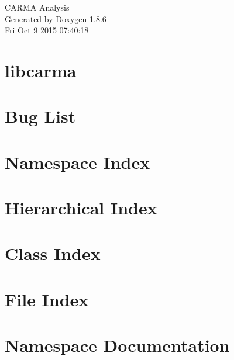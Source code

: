\documentclass[twoside]{book}
\newcommand{\clearemptydoublepage}{%
  \newpage{\pagestyle{empty}\cleardoublepage}%
}
\begin{document}
\hypersetup{pageanchor=false}
\begin{titlepage}
\vspace*{7cm}
\begin{center}%
{\Large C\-A\-R\-M\-A Analysis }\\
\vspace*{1cm}
{\large Generated by Doxygen 1.8.6}\\
\vspace*{0.5cm}
{\small Fri Oct 9 2015 07:40:18}\\
\end{center}
\end{titlepage}
\clearemptydoublepage
\tableofcontents
\clearemptydoublepage
{}
\hypersetup{pageanchor=true}

\chapter{libcarma}
\label{md__home_vish_code_trunk_cpp_libcarma__r_e_a_d_m_e}
\hypertarget{md__home_vish_code_trunk_cpp_libcarma__r_e_a_d_m_e}{}

\chapter{Bug List}
\label{bug}
\hypertarget{bug}{}

\chapter{Namespace Index}

\chapter{Hierarchical Index}

\chapter{Class Index}

\chapter{File Index}

\chapter{Namespace Documentation}






\end{document}
